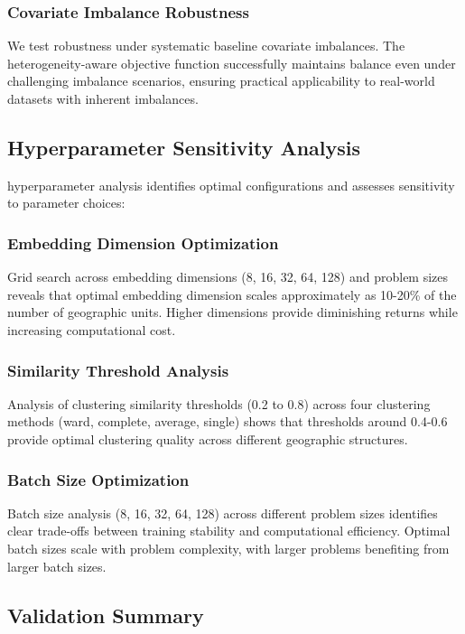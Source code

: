 \documentclass[final,3p,fleqn, 10pt]{elsarticle}
\begin{document}
\subsubsection{Covariate Imbalance Robustness}
We test robustness under systematic baseline covariate imbalances. The heterogeneity-aware objective function successfully maintains balance even under challenging imbalance scenarios, ensuring practical applicability to real-world datasets with inherent imbalances.

\subsection{Hyperparameter Sensitivity Analysis}

hyperparameter analysis identifies optimal configurations and assesses sensitivity to parameter choices:

\subsubsection{Embedding Dimension Optimization}
Grid search across embedding dimensions (8, 16, 32, 64, 128) and problem sizes reveals that optimal embedding dimension scales approximately as 10-20\% of the number of geographic units. Higher dimensions provide diminishing returns while increasing computational cost.

\subsubsection{Similarity Threshold Analysis}
Analysis of clustering similarity thresholds (0.2 to 0.8) across four clustering methods (ward, complete, average, single) shows that thresholds around 0.4-0.6 provide optimal clustering quality across different geographic structures.

\subsubsection{Batch Size Optimization}
Batch size analysis (8, 16, 32, 64, 128) across different problem sizes identifies clear trade-offs between training stability and computational efficiency. Optimal batch sizes scale with problem complexity, with larger problems benefiting from larger batch sizes.

\subsection{Validation Summary}
\end{document}
